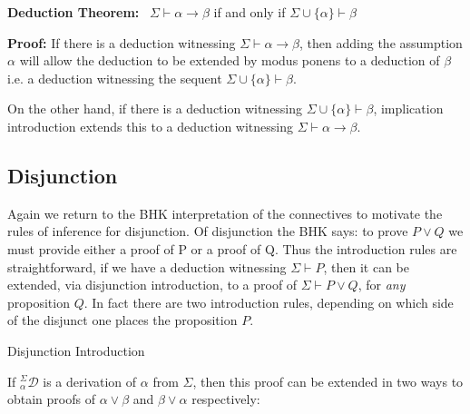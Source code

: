 \documentclass{book}
\begin{document}
    {\bf Deduction Theorem:} \ $\Sigma \vdash \alpha \rightarrow \beta$ if and only if $\Sigma \cup \{\alpha\} \vdash \beta$

	{\bf Proof:} If there is a deduction witnessing $\Sigma \vdash \alpha \rightarrow \beta$, then adding the assumption $\alpha$ will allow the deduction to be extended by modus ponens to a deduction of $\beta$ i.e. a deduction witnessing the sequent $\Sigma \cup \{\alpha\} \vdash \beta$. 

    On the other hand, if there is a deduction witnessing $\Sigma \cup \{\alpha\} \vdash \beta$, implication introduction extends this to a deduction witnessing $\Sigma \vdash \alpha \rightarrow \beta$.

    
    \newpage
    \subsection*{Disjunction}

    Again we return to the BHK interpretation of the connectives to motivate the rules of inference for disjunction. Of disjunction the BHK says: to prove $P \lor Q$  we must provide either a proof of P or a proof of Q. Thus the introduction rules are straightforward, if we have a deduction witnessing $\Sigma \vdash P$, then it can be extended, via disjunction introduction, to a proof of $\Sigma \vdash P \lor Q$, for \emph{any} proposition $Q$. In fact there are two introduction rules, depending on which side of the disjunct one places the proposition $P$. 

    \vspace{0.1cm}

    {Disjunction Introduction}

        If $^{\Sigma}_{\alpha}\mathcal{D}$ is a derivation of $\alpha$ from $\Sigma$, then this proof can be extended in two ways to obtain proofs of $\alpha \lor \beta$ and $\beta \lor \alpha$ respectively: 
\end{document}
